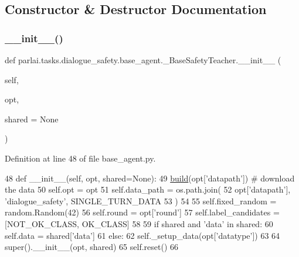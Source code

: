 \subsection{Constructor \& Destructor Documentation}
\mbox{\label{classparlai_1_1tasks_1_1dialogue__safety_1_1base__agent_1_1__BaseSafetyTeacher_a30315340193b3ddc6edde594193b3325}} 
\subsubsection{\texorpdfstring{\+\_\+\+\_\+init\+\_\+\+\_\+()}{\_\_init\_\_()}}
{\footnotesize\ttfamily def parlai.\+tasks.\+dialogue\+\_\+safety.\+base\+\_\+agent.\+\_\+\+Base\+Safety\+Teacher.\+\_\+\+\_\+init\+\_\+\+\_\+ (\begin{DoxyParamCaption}\item[{}]{self,  }\item[{}]{opt,  }\item[{}]{shared = {\ttfamily None} }\end{DoxyParamCaption})}



Definition at line 48 of file base\+\_\+agent.\+py.


\begin{DoxyCode}
48     \textcolor{keyword}{def }\_\_init\_\_(self, opt, shared=None):
49         \hyperlink{namespaceparlai_1_1mturk_1_1tasks_1_1talkthewalk_1_1download_a8c0fbb9b6dfe127cb8c1bd6e7c4e33fd}{build}(opt[\textcolor{stringliteral}{'datapath'}])  \textcolor{comment}{# download the data}
50         self.opt = opt
51         self.data\_path = os.path.join(
52             opt[\textcolor{stringliteral}{'datapath'}], \textcolor{stringliteral}{'dialogue\_safety'}, SINGLE\_TURN\_DATA
53         )
54 
55         self.fixed\_random = random.Random(42)
56         self.round = opt[\textcolor{stringliteral}{'round'}]
57         self.label\_candidates = [NOT\_OK\_CLASS, OK\_CLASS]
58 
59         \textcolor{keywordflow}{if} shared \textcolor{keywordflow}{and} \textcolor{stringliteral}{'data'} \textcolor{keywordflow}{in} shared:
60             self.data = shared[\textcolor{stringliteral}{'data'}]
61         \textcolor{keywordflow}{else}:
62             self.\_setup\_data(opt[\textcolor{stringliteral}{'datatype'}])
63 
64         super().\_\_init\_\_(opt, shared)
65         self.reset()
66 
\end{DoxyCode}


